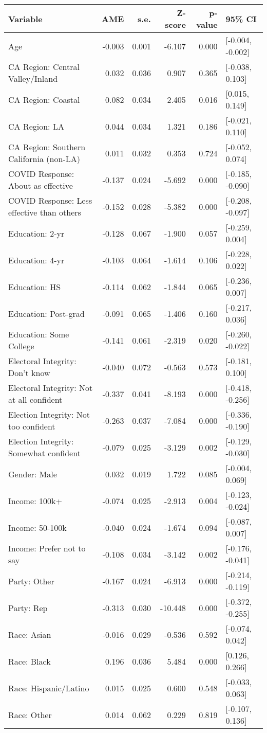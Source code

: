 \begin{tabular}{lrrrrl}
  \toprule
Variable & AME & s.e. & Z-score & p-value & 95\% CI \\ 
  \midrule
Age & -0.003 & 0.001 & -6.107 & 0.000 & [-0.004, -0.002] \\ 
  CA Region: Central Valley/Inland & 0.032 & 0.036 & 0.907 & 0.365 & [-0.038, 0.103] \\ 
  CA Region: Coastal & 0.082 & 0.034 & 2.405 & 0.016 & [0.015, 0.149] \\ 
  CA Region: LA & 0.044 & 0.034 & 1.321 & 0.186 & [-0.021, 0.110] \\ 
  CA Region: Southern California (non-LA) & 0.011 & 0.032 & 0.353 & 0.724 & [-0.052, 0.074] \\ 
  COVID Response: About as effective & -0.137 & 0.024 & -5.692 & 0.000 & [-0.185, -0.090] \\ 
  COVID Response: Less effective than others & -0.152 & 0.028 & -5.382 & 0.000 & [-0.208, -0.097] \\ 
  Education: 2-yr & -0.128 & 0.067 & -1.900 & 0.057 & [-0.259, 0.004] \\ 
  Education: 4-yr & -0.103 & 0.064 & -1.614 & 0.106 & [-0.228, 0.022] \\ 
  Education: HS & -0.114 & 0.062 & -1.844 & 0.065 & [-0.236, 0.007] \\ 
  Education: Post-grad & -0.091 & 0.065 & -1.406 & 0.160 & [-0.217, 0.036] \\ 
  Education: Some College & -0.141 & 0.061 & -2.319 & 0.020 & [-0.260, -0.022] \\ 
  Electoral Integrity: Don't know & -0.040 & 0.072 & -0.563 & 0.573 & [-0.181, 0.100] \\ 
  Electoral Integrity: Not at all confident & -0.337 & 0.041 & -8.193 & 0.000 & [-0.418, -0.256] \\ 
  Election Integrity: Not too confident & -0.263 & 0.037 & -7.084 & 0.000 & [-0.336, -0.190] \\ 
  Election Integrity: Somewhat confident & -0.079 & 0.025 & -3.129 & 0.002 & [-0.129, -0.030] \\ 
  Gender: Male & 0.032 & 0.019 & 1.722 & 0.085 & [-0.004, 0.069] \\ 
  Income: 100k+ & -0.074 & 0.025 & -2.913 & 0.004 & [-0.123, -0.024] \\ 
  Income: 50-100k & -0.040 & 0.024 & -1.674 & 0.094 & [-0.087, 0.007] \\ 
  Income: Prefer not to say & -0.108 & 0.034 & -3.142 & 0.002 & [-0.176, -0.041] \\ 
  Party: Other & -0.167 & 0.024 & -6.913 & 0.000 & [-0.214, -0.119] \\ 
  Party: Rep & -0.313 & 0.030 & -10.448 & 0.000 & [-0.372, -0.255] \\ 
  Race: Asian & -0.016 & 0.029 & -0.536 & 0.592 & [-0.074, 0.042] \\ 
  Race: Black & 0.196 & 0.036 & 5.484 & 0.000 & [0.126, 0.266] \\ 
  Race: Hispanic/Latino & 0.015 & 0.025 & 0.600 & 0.548 & [-0.033, 0.063] \\ 
  Race: Other & 0.014 & 0.062 & 0.229 & 0.819 & [-0.107, 0.136] \\ 
   \bottomrule
\end{tabular}
